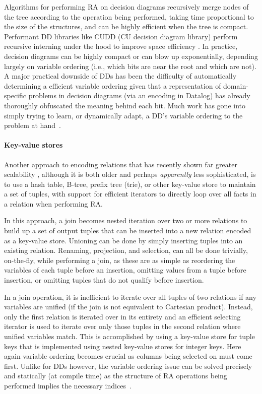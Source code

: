 Algorithms for performing RA on decision diagrams recursively merge nodes of the tree according to the operation being performed, taking time proportional to the size of the structures, and can be highly efficient when the tree is compact. Performant DD libraries like CUDD (CU decision diagram library) perform recursive interning under the hood to improve space efficiency \cite{somenzi1998cudd}. In practice, decision diagrams can be highly compact or can blow up exponentially, depending largely on variable ordering (i.e., which bits are near the root and which are not). A major practical downside of DDs has been the difficulty of automatically determining a efficient variable ordering given that a representation of domain-specific problems in decision diagrams (via an encoding in Datalog) has already thoroughly obfuscated the meaning behind each bit. Much work has gone into simply trying to learn, or dynamically adapt, a DD's variable ordering to the problem at hand~\cite{580029,1586251}.

\paragraph{Key-value stores} Another approach to encoding relations that has recently shown far greater scalability \cite{Scholz:2016:FLP:2892208.2892226}, although it is both older and perhaps \emph{apparently} less sophisticated, is to use a hash table, B-tree, prefix tree (trie), or other key-value store to maintain a set of tuples, with support for efficient iterators to directly loop over all facts in a relation when performing RA.

In this approach, a join becomes nested iteration over two or more relations to build up a set of output tuples that can be inserted into a new relation encoded as a key-value store. Unioning can be done by simply inserting tuples into an existing relation. Renaming, projection, and selection, can all be done trivially, on-the-fly, while performing a join, as these are as simple as reordering the variables of each tuple before an insertion, omitting values from a tuple before insertion, or omitting tuples that do not qualify before insertion.

In a join operation, it is inefficient to iterate over all tuples of two relations if any variables are unified (if the join is not equivalent to Cartesian product). Instead, only the first relation is iterated over in its entirety and an efficient selecting iterator is used to iterate over only those tuples in the second relation where unified variables match. This is accomplished by using a key-value store for tuple keys that is implemented using nested key-value stores for integer keys. Here again variable ordering becomes crucial as columns being selected on must come first. Unlike for DDs however, the variable ordering issue can be solved precisely and statically (at compile time) as the structure of RA operations being performed implies the necessary indices~\cite{Subotic:2018:AIS:3282495.3302538}.

